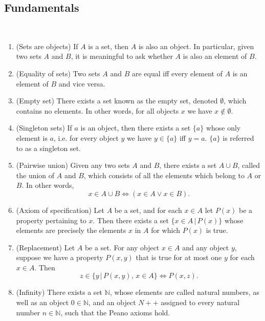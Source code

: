 \documentclass{article}
\begin{document}
\subsection{Fundamentals}
\begin{definition}
	\label{setaxioms}
	\,
	\begin{enumerate}
		\item (Sets are objects) If \(A\) is a set, then \(A\) is also an object. In particular, given two sets \(A\) and \(B\), it is meaningful to ask whether \(A\) is also an element of \(B\).
		\item (Equality of sets) Two sets \(A\) and \(B\) are equal iff every element of \(A\) is an element of \(B\) and vice versa.
		\item (Empty set) There exists a set known as the empty set, denoted \(\emptyset\), which contains no elements. In other words, for all objects \(x\) we have \(x\notin\emptyset\).
		\item (Singleton sets) If \(a\) is an object, then there exists a set \(\{a\}\) whose only element is \(a\), i.e. for every object \(y\) we have \(y\in\{a\}\) iff \(y=a\). \(\{a\}\) is referred to as a singleton set.
		\item (Pairwise union) Given any two sets \(A\) and \(B\), there exists a set \(A\cup B\), called the union of \(A\) and \(B\), which consists of all the elements which belong to \(A\) or \(B\). In other words,
			\begin{equation*}
				x\in A\cup B\Leftrightarrow(x\in A\vee x\in B).
			\end{equation*}
		\item (Axiom of specification) Let \(A\) be a set, and for each \(x\in A\) let \(P(x)\) be a property pertaining to \(x\). Then there exists a set \(\{x\in A\,|\,P(x)\}\) whose elements are precisely the elements \(x\) in \(A\) for which \(P(x)\) is true.
		\item (Replacement) Let \(A\) be a set. For any object \(x\in A\) and any object \(y\), suppose we have a property \(P(x,y)\) that is true for at most one \(y\) for each \(x\in A\). Then
			\begin{equation*}
				z\in\{y\,|\,P(x,y),\, x\in A\}\Leftrightarrow P(x,z).
			\end{equation*}
		\item (Infinity) There exists a set \(\mathbb{N}\), whose elements are called natural numbers, as well as an object \(0\in\mathbb{N}\), and an object \(N++\) assigned to every natural number \(n\in\mathbb{N}\), such that the Peano axioms hold.

\end{enumerate}
\end{definition}
\end{document}
